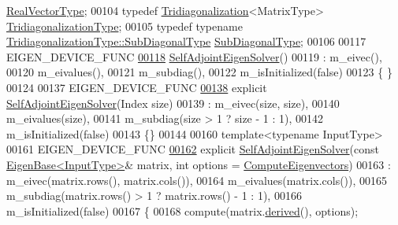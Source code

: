 \begin{DoxyCode}
      \hyperlink{class_eigen_1_1internal_1_1_tensor_lazy_evaluator_writable}{RealVectorType};
00104     typedef \hyperlink{group___eigenvalues___module_class_eigen_1_1_tridiagonalization}{Tridiagonalization}<MatrixType> 
      \hyperlink{group___eigenvalues___module_class_eigen_1_1_tridiagonalization}{TridiagonalizationType};
00105     typedef typename \hyperlink{group___core___module_class_eigen_1_1_matrix}{TridiagonalizationType::SubDiagonalType} 
      \hyperlink{group___core___module_class_eigen_1_1_matrix}{SubDiagonalType};
00106 
00117     EIGEN\_DEVICE\_FUNC
\hyperlink{group___eigenvalues___module_af3466b3809be4a7738d84493d80d4737}{00118}     \hyperlink{group___eigenvalues___module_class_eigen_1_1_self_adjoint_eigen_solver}{SelfAdjointEigenSolver}()
00119         : m\_eivec(),
00120           m\_eivalues(),
00121           m\_subdiag(),
00122           m\_isInitialized(false)
00123     \{ \}
00124 
00137     EIGEN\_DEVICE\_FUNC
\hyperlink{group___eigenvalues___module_af20f466a4c29477271e91841e3382b27}{00138}     \textcolor{keyword}{explicit} \hyperlink{group___eigenvalues___module_af20f466a4c29477271e91841e3382b27}{SelfAdjointEigenSolver}(Index size)
00139         : m\_eivec(size, size),
00140           m\_eivalues(size),
00141           m\_subdiag(size > 1 ? size - 1 : 1),
00142           m\_isInitialized(false)
00143     \{\}
00144 
00160     \textcolor{keyword}{template}<\textcolor{keyword}{typename} InputType>
00161     EIGEN\_DEVICE\_FUNC
\hyperlink{group___eigenvalues___module_ade694ed7b0a4d9da9480cedc849be76f}{00162}     \textcolor{keyword}{explicit} \hyperlink{group___eigenvalues___module_ade694ed7b0a4d9da9480cedc849be76f}{SelfAdjointEigenSolver}(\textcolor{keyword}{const} 
      \hyperlink{group___core___module_struct_eigen_1_1_eigen_base}{EigenBase<InputType>}& matrix, \textcolor{keywordtype}{int} options = 
      \hyperlink{group__enums_ggae3e239fb70022eb8747994cf5d68b4a9ada93d8885bde32b876ba4af01d3292cc}{ComputeEigenvectors})
00163       : m\_eivec(matrix.rows(), matrix.cols()),
00164         m\_eivalues(matrix.cols()),
00165         m\_subdiag(matrix.rows() > 1 ? matrix.rows() - 1 : 1),
00166         m\_isInitialized(false)
00167     \{
00168       compute(matrix.\hyperlink{group___core___module_a324b16961a11d2ecfd2d1b7dd7946545}{derived}(), options);

\end{DoxyCode}
